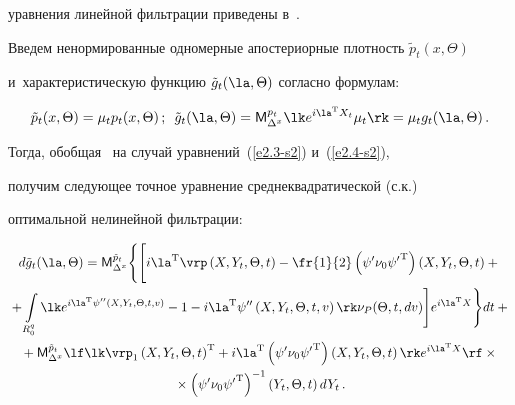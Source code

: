 уравнения линейной фильтрации приведены в~\cite{2-s2}.



Введем ненормированные одномерные апостериорные плотность $\tilde p_t (x,\Theta)$  

и~характеристическую функцию $\tilde g_t (\la,\Theta)$ согласно формулам:

     \begin{equation*}

     \tilde{p}_t (x,\Theta) = \mu_t p_t (x,\Theta)\,; \enskip \tilde{g}_t (\la,\Theta) = 

    {\sf M}_{\Delta^x}^{p_t} \lk e^{i\la^{\mathrm{T}} X_t} \mu_t\rk =\mu_t g_t (\la,\Theta)\,.


\end{equation*}

Тогда, обобщая~\cite{6-s2} на случай уравнений~(\ref{e2.3-s2}) и~(\ref{e2.4-s2}), 

получим следующее точное уравнение среднеквадратической (с.к.)\ 

оптимальной нелинейной фильтрации:

  \begin{multline}

  d\tilde{g}_t (\la,\Theta) = {\sf M}_{\Delta^x}^{\tilde{p}_t} 

    \Bigg\{ \Bigg[ i \la^{\mathrm{T}} \vrp \left( X,Y_t,\Theta, t\right) -\fr{1}{2} 

    \left(\psi'\nu_0{\psi'}^{\mathrm{T}}\right) \left( X,Y_t,\Theta, t\right)+{}\\

{}+ \int\limits_{R_0^q} \lk e^{i\la^{\mathrm{T}} \psi'' 

\left( X,Y_t,\Theta, t,v\right)} -1- i\la^{\mathrm{T}} \psi'' 

\left( X,Y_t,\Theta, t,v\right)\rk \nu_P (\Theta, t, dv)\Bigg] 

e^{i\la^{\mathrm{T}} X} \Bigg\}dt +{}\\

  {}+ {\sf M}_{\Delta^x}^{\tilde{p}_t} \lf \lk \vrp_1 

  \left( X,Y_t,\Theta, t\right)^{\mathrm{T}} + 

  i\la^{\mathrm{T}} \left(\psi'\nu_0 {\psi'}^{\mathrm{T}}\right) 

  \left( X,Y_t,\Theta, t\right)\rk e^{i\la^{\mathrm{T}} X}\rf\times{}\\

  {}\times

   \left(\psi'\nu_0{\psi'}^{\mathrm{T}}\right)^{-1}\left( Y_t,\Theta, t\right) dY_t\,.

   \label{e2.6-s2}

   \end{multline}



